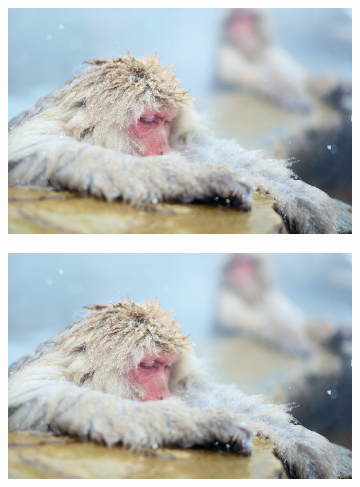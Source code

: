 \documentclass{article}
\begin{document}
\begin{figure}
\begin{subfigure}[b]{0.49 \textwidth}
    \end{subfigure}
    \begin{subfigure}[b]{0.49 \textwidth}
    \includegraphics[width=\textwidth]{Images/jpeg/reconstructed/test2_60.png}
    \end{subfigure}
    \begin{subfigure}[b]{0.49 \textwidth}
    \includegraphics[width=\textwidth]{Images/jpeg/reconstructed/test2_90.png}
    \end{subfigure}
    \end{figure}
\end{document}
